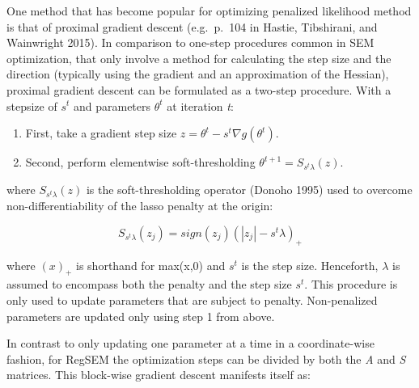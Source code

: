 \documentclass[article]{jss}
\begin{document}
One method that has become popular for optimizing penalized likelihood
method is that of proximal gradient descent (e.g.~p.~104 in Hastie,
Tibshirani, and Wainwright 2015). In comparison to one-step procedures
common in SEM optimization, that only involve a method for calculating
the step size and the direction (typically using the gradient and an
approximation of the Hessian), proximal gradient descent can be
formulated as a two-step procedure. With a stepsize of \(s^{t}\) and
parameters \(\theta^{t}\) at iteration \textit{t}:

\begin{enumerate}
    \item First, take a gradient step size $z = \theta^{t} - s^{t} \nabla g(\theta^{t})$.
    \item Second, perform elementwise soft-thresholding $\theta^{t+1} = S_{s^{t} \lambda}(z)$.
\end{enumerate}

where \(S_{s^{t} \lambda}(z)\) is the soft-thresholding operator (Donoho
1995) used to overcome non-differentiability of the lasso penalty at the
origin:

\begin{equation}
S_{s^{t} \lambda}(z_{j}) = sign(z_{j})(|z_{j}|-s^{t} \lambda)_{+}
\end{equation}

\noindent
where \((x)_{+}\) is shorthand for max(x,0) and \(s^{t}\) is the step
size. Henceforth, \(\lambda\) is assumed to encompass both the penalty
and the step size \(s^{t}\). This procedure is only used to update
parameters that are subject to penalty. Non-penalized parameters are
updated only using step 1 from above.

In contrast to only updating one parameter at a time in a
coordinate-wise fashion, for RegSEM the optimization steps can be
divided by both the \textit{A} and \textit{S} matrices. This block-wise
gradient descent manifests itself as:

\noindent
\end{document}
